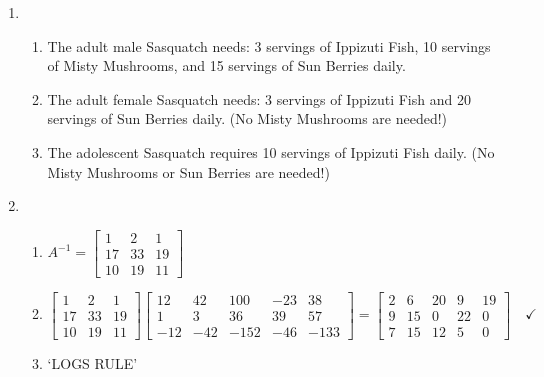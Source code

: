 \begin{enumerate}
\setcounter{enumi}{\value{HW}}

\addtocounter{enumi}{1}

\item  \begin{enumerate} \item  The adult male Sasquatch needs:  3 servings of Ippizuti Fish, 10 servings of Misty Mushrooms, and 15 servings of Sun Berries daily.

\item  The adult female Sasquatch needs:  3 servings of Ippizuti Fish and 20 servings of Sun Berries daily.  (No Misty Mushrooms are needed!)

\item  The adolescent Sasquatch requires 10 servings of Ippizuti Fish daily.  (No Misty Mushrooms or Sun Berries are needed!)

\end{enumerate}

\item  \begin{enumerate}

\item  $A^{-1} = \left[ \begin{array}{rrr} 1 & 2 & 1 \\ 17 & 33 & 19 \\ 10 & 19 & 11 \end{array} \right] $

\item  $ \left[ \begin{array}{rrr} 1 & 2 & 1 \\ 17 & 33 & 19 \\ 10 & 19 & 11 \end{array} \right] \left[  \begin{array}{rrrrr} 12 & 42 & 100 & -23 & 38 \\ 1 & 3 & 36 & 39 & 57 \\ -12 & -42 & -152 & -46 & -133 \end{array} \right] =  \left[  \begin{array}{rrrrr} 2 & 6 & 20 & 9 & 19 \\ 9 & 15 & 0 & 22 & 0 \\ 7 & 15 & 12 & 5 & 0 \end{array} \right] \quad \checkmark$

\item  `LOGS RULE'

\end{enumerate}

\end{enumerate}

\closegraphsfile